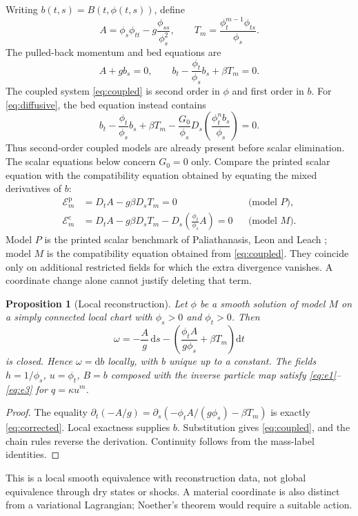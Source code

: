 \documentclass[11pt,a4paper,oneside]{report}
\numberwithin{equation}{chapter}
\newtheorem{proposition}[theorem]{Proposition}
\newcommand{\E}{\mathcal E}
\newcommand{\dd}{\mathrm d}
\begin{document}
Writing $b(t,s)=B(t,\phi(t,s))$, define
\begin{equation}
A=\phi_s\phi_{tt}-g\frac{\phi_{ss}}{\phi_s^2},\qquad
T_m=\frac{\phi_t^{m-1}\phi_{ts}}{\phi_s}.
\end{equation}
The pulled-back momentum and bed equations are
\begin{equation}\label{eq:coupled}
A+gb_s=0,\qquad b_t-\frac{\phi_t}{\phi_s}b_s+\beta T_m=0.
\end{equation}
The coupled system \eqref{eq:coupled} is second order in $\phi$ and first order in $b$. For \eqref{eq:diffusive}, the bed equation instead contains
\begin{equation}\label{eq:diffusive-material}
b_t-\frac{\phi_t}{\phi_s}b_s+\beta T_m
-\frac{G_0}{\phi_s}D_s\!\left(\frac{\phi_t^n b_s}{\phi_s}\right)=0.
\end{equation}
Thus second-order coupled models are already present before scalar elimination. The scalar equations below concern $G_0=0$ only.
Compare the printed scalar equation with the compatibility equation obtained by equating the mixed derivatives of $b$:
\begin{align}
\E_m^{\mathrm p}&=D_tA-g\beta D_sT_m=0 &&\text{(model $P$)},\label{eq:printed}\\
\E_m^{\mathrm c}&=D_tA-g\beta D_sT_m-D_s\!\left(\frac{\phi_t}{\phi_s}A\right)=0 &&\text{(model $M$)}.\label{eq:corrected}
\end{align}
Model $P$ is the printed scalar benchmark of Paliathanasis, Leon and Leach \cite{ap}; model $M$ is the compatibility equation obtained from \eqref{eq:coupled}. They coincide only on additional restricted fields for which the extra divergence vanishes. A coordinate change alone cannot justify deleting that term.

\begin{proposition}[Local reconstruction]\label{prop:reconstruct}
Let $\phi$ be a smooth solution of model $M$ on a simply connected local chart with $\phi_s>0$ and $\phi_t>0$. Then
\begin{equation}\label{eq:bedform}
\omega=-\frac{A}{g}\,\dd s-
\left(\frac{\phi_tA}{g\phi_s}+\beta T_m\right)\dd t
\end{equation}
is closed. Hence $\omega=\dd b$ locally, with $b$ unique up to a constant. The fields $h=1/\phi_s$, $u=\phi_t$, $B=b$ composed with the inverse particle map satisfy \eqref{eq:e1}--\eqref{eq:e3} for $q=\kappa u^m$.
\end{proposition}
\begin{proof}
The equality $\partial_t(-A/g)=\partial_s(-\phi_tA/(g\phi_s)-\beta T_m)$ is exactly \eqref{eq:corrected}. Local exactness supplies $b$. Substitution gives \eqref{eq:coupled}, and the chain rules reverse the derivation. Continuity follows from the mass-label identities.\end{proof}
This is a local smooth equivalence with reconstruction data, not global equivalence through dry states or shocks. A material coordinate is also distinct from a variational Lagrangian; Noether's theorem would require a suitable action.
\end{document}
